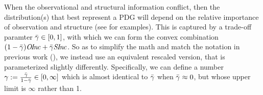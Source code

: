 When the observational and structural information conflict, then the distribution(s)
that best represent a PDG will depend on the relative importance of observation and structure (see  for examples).
%
%
This is captured by a trade-off paramter ${\bar\gamma} \in [0,1]$,
with which we can form the convex combination
$(1-{\bar\gamma})\mathit{O\mskip-2.5muI\mskip-3.5mun\mskip-1.7muc} + {\bar\gamma} \mathit{S\mskip-2.5muI\mskip-3.5mun\mskip-1.7muc}$. 
So as to 
simplify the math
and match the notation in
previous work (\citeyear{pdg-aaai,one-true-loss}),
we instead use an equivalent rescaled version, 
that is parameterized slightly differently.
Specifically, we can define 
a number
$\gamma := \frac{{\bar\gamma}}{1-{\bar\gamma}} \in [0,\infty]$
which is almost identical to ${\bar\gamma}$ when ${\bar\gamma} \approx 0$, but whose upper limit is $\infty$ rather than 1. 
